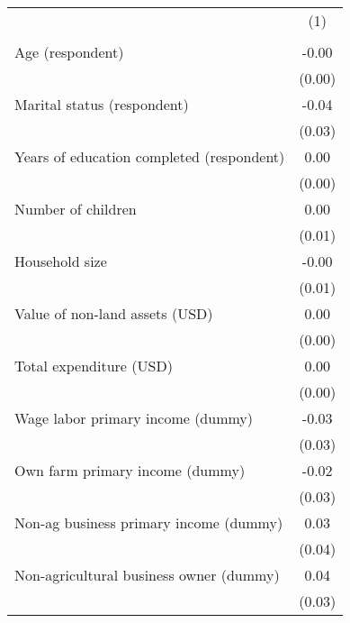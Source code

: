 {
\def\sym#1{\ifmmode^{#1}\else\(^{#1}\)\fi}
\begin{tabular}{l*{1}{S}}
\toprule
          &\\
          &\\
\midrule
Age (respondent)&    -0.00\\
          &   (0.00)\\
Marital status (respondent)&    -0.04\\
          &   (0.03)\\
Years of education completed (respondent)&     0.00\\
          &   (0.00)\\
Number of children&     0.00\\
          &   (0.01)\\
Household size&    -0.00\\
          &   (0.01)\\
Value of non-land assets (USD)&     0.00\\
          &   (0.00)\\
Total expenditure (USD)&     0.00\\
          &   (0.00)\\
Wage labor primary income (dummy)&    -0.03\\
          &   (0.03)\\
Own farm primary income (dummy)&    -0.02\\
          &   (0.03)\\
Non-ag business primary income (dummy)&     0.03\\
          &   (0.04)\\
Non-agricultural business owner (dummy)&     0.04\\
          &   (0.03)\\
\bottomrule
\end{tabular}
}
